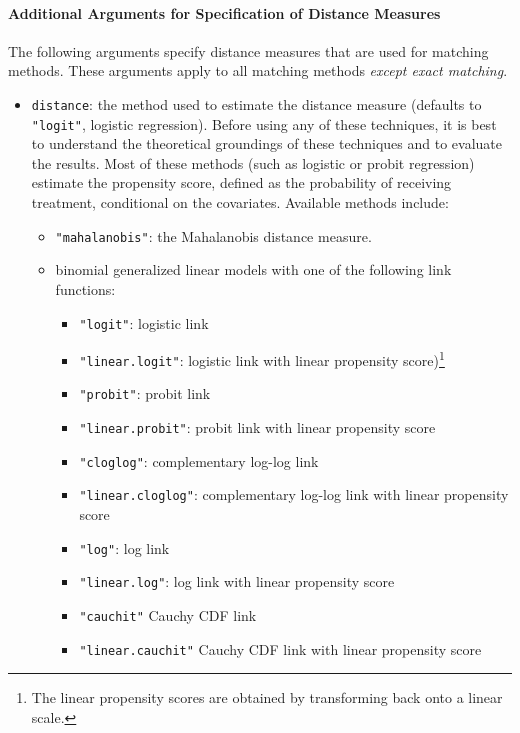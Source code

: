 \paragraph{Additional Arguments for Specification of
  Distance Measures}
\label{subsubsec:inputs-all}

The following arguments specify distance measures that are used for
matching methods. These arguments apply to all matching methods {\it
  except exact matching}.

\begin{itemize}
  
\item \texttt{distance}: the method used to estimate the distance
  measure (defaults to {\tt "logit"}, logistic regression).  Before
  using any of these techniques, it is best to understand the
  theoretical groundings of these techniques and to evaluate the
  results.  Most of these methods (such as logistic or probit
  regression) estimate the propensity score, defined as the
  probability of receiving treatment, conditional on the covariates.
  Available methods include:
  \begin{itemize}
  \item {\tt "mahalanobis"}: the Mahalanobis distance measure.
  \item binomial generalized linear models with one of the following
    link functions:
    \begin{itemize}
    \item \texttt{"logit"}: logistic link 
    \item {\tt "linear.logit"}: logistic link with linear propensity
      score)\footnote{The linear propensity scores are obtained by
        transforming back onto a linear scale.}
    \item \texttt{"probit"}: probit link
    \item {\tt "linear.probit"}: probit link with linear propensity
      score
    \item {\tt "cloglog"}: complementary log-log link
    \item {\tt "linear.cloglog"}: complementary log-log link with linear
      propensity score
    \item {\tt "log"}: log link
    \item {\tt "linear.log"}: log link with linear propensity score
    \item {\tt "cauchit"} Cauchy CDF link
    \item {\tt "linear.cauchit"} Cauchy CDF link with linear propensity
      score

\end{itemize}
\end{itemize}
\end{itemize}
